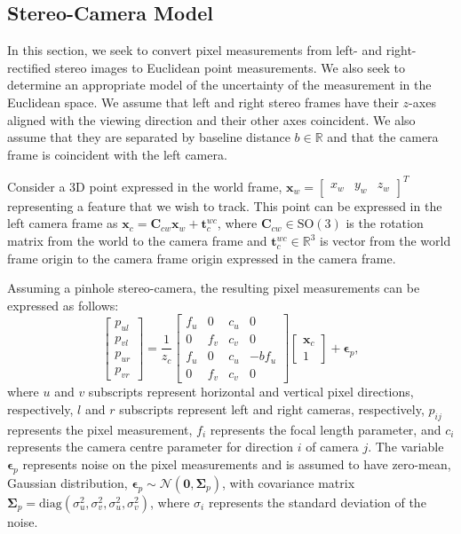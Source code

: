 \documentclass[lettersize,journal]{IEEEtran}
\newcommand{\diag}[1]{\mbox{diag}\left(#1\right)}
\begin{document}
\subsection{Stereo-Camera Model}\label{App:stereo}

In this section, we seek to convert pixel measurements from left- and right-rectified stereo images to Euclidean point measurements. We also seek to determine an appropriate model of the uncertainty of the measurement in the Euclidean space. We assume that left and right stereo frames have their $z$-axes aligned with the viewing direction and their other axes coincident. We also assume that they are separated by baseline distance $ b\in \mathbb{R} $ and that the camera frame is coincident with the left camera.  

Consider a 3D point expressed in the world frame, $ \bm{x}_w = \begin{bmatrix} x_w & y_w & z_w  \end{bmatrix}^T $ representing a feature that we wish to track. This point can be expressed in the left camera frame as  $ \bm{x}_c = \bm{C}_{cw} \bm{x}_w + \bm{t}^{wc}_c $, where $ \bm{C}_{cw} \in \mbox{SO}(3)$ is the rotation matrix from the world to the camera frame and $ \bm{t}^{wc}_c \in \mathbb{R}^3 $ is vector from the world frame origin to the camera frame origin expressed in the camera frame.

Assuming a pinhole stereo-camera, the resulting pixel measurements can be expressed as follows:
\begin{equation}
	\begin{bmatrix}
		p_{ul}\\p_{vl}\\p_{ur}\\p_{vr}
	\end{bmatrix} = \frac{1}{z_c}\begin{bmatrix}
		f_{u} & 0 & c_{u} & 0\\
		0 & f_{v} & c_{v} & 0\\
		f_{u} & 0 & c_{u} & -b f_{u}\\
		0 & f_{v} & c_{v} & 0
	\end{bmatrix} \begin{bmatrix}
	\bm{x}_c \\ 1
	\end{bmatrix} + \bm{\epsilon}_{p},
\end{equation}
where $ u $ and $ v $ subscripts represent horizontal and vertical pixel directions, respectively, $ l $ and $ r $ subscripts represent left and right cameras, respectively, $ p_{ij} $ represents the pixel measurement, $ f_{i} $ represents the focal length parameter, and $ c_{i} $ represents the camera centre parameter for direction $ i $ of camera $ j $. The variable $ \bm{\epsilon}_{p} $ represents noise on the pixel measurements and is assumed to have zero-mean, Gaussian distribution,
$ \bm{\epsilon}_{p} \sim \mathcal{N}(\bm{0}, \bm{\Sigma}_p) $,
with covariance matrix $ \bm{\Sigma}_p = \diag{\sigma_u^2 ,\sigma_v^2,\sigma_u^2, \sigma_v^2} $, where $ \sigma_i $ represents the standard deviation of the noise. 
\end{document}
